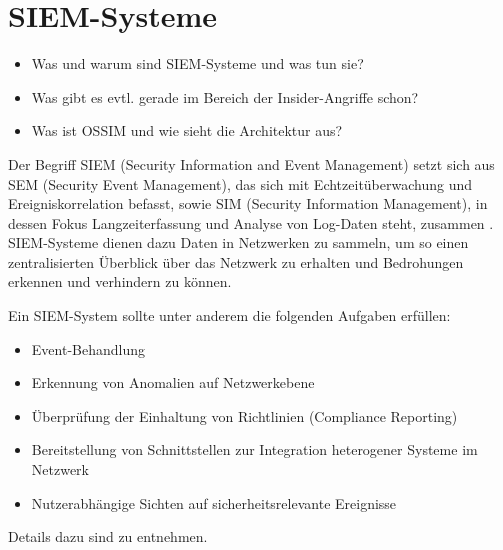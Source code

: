 \section{SIEM-Systeme}

\begin{itemize}
  \item Was und warum sind SIEM-Systeme und was tun sie?
  \item Was gibt es evtl. gerade im Bereich der Insider-Angriffe schon?
  \item Was ist OSSIM und wie sieht die Architektur aus?
\end{itemize}

\label{sec_basics_siem}




Der Begriff SIEM (Security Information and Event Management) setzt sich aus SEM (Security Event Management), das sich mit Echtzeitüberwachung und Ereigniskorrelation befasst, sowie SIM (Security Information Management), in dessen Fokus Langzeiterfassung und Analyse von Log-Daten steht, zusammen \cite{gartner2011}. SIEM-Systeme dienen dazu Daten in Netzwerken zu sammeln, um so einen zentralisierten Überblick über das Netzwerk zu erhalten und Bedrohungen erkennen und verhindern zu können. 

Ein SIEM-System sollte unter anderem die folgenden Aufgaben erfüllen: 
\begin{itemize}
	\item Event-Behandlung
	\item Erkennung von Anomalien auf Netzwerkebene
	\item Überprüfung der Einhaltung von Richtlinien (Compliance Reporting)
	\item Bereitstellung von Schnittstellen zur Integration heterogener Systeme im Netzwerk %
	\item Nutzerabhängige Sichten auf sicherheitsrelevante Ereignisse %
\end{itemize} 
Details dazu sind \cite{detken2015} zu entnehmen.

